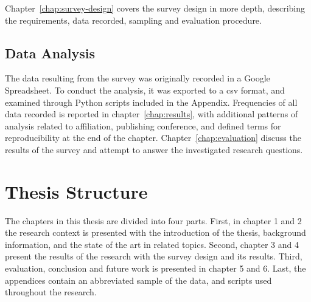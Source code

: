 Chapter~\ref{chap:survey-design} covers the survey design in more depth, describing the requirements, data recorded, sampling and evaluation procedure.

\subsection{Data Analysis}
The data resulting from the survey was originally recorded in a Google Spreadsheet. To conduct the analysis, it was exported to a csv format, and examined through Python scripts included in the Appendix. Frequencies of all data recorded is reported in chapter~\ref{chap:results}, with additional patterns of analysis related to affiliation, publishing conference, and defined terms for reproducibility at the end of the chapter. Chapter~\ref{chap:evaluation} discuss the results of the survey and attempt to answer the investigated research questions.

\section{Thesis Structure}
The chapters in this thesis are divided into four parts. First, in chapter 1 and 2 the research context is presented with the introduction of the thesis, background information, and the state of the art in related topics. Second, chapter 3 and 4 present the results of the research with the survey design and its results. Third, evaluation, conclusion and future work is presented in chapter 5 and 6. Last, the appendices contain an abbreviated sample of the data, and scripts used throughout the research.

